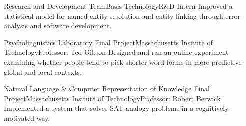 \documentclass[11pt,letter]{moderncv}
\begin{document}
\raggedright
{}%
{Research and Development Team}{Basis Technology}{R\&D Intern}{}{
%
Improved a statistical model for named-entity resolution and entity linking through error analysis and software development.
%
}
\vspace*{0.2em}

\raggedright
{}%
{Psycholinguistics Laboratory Final Project}{Massachusetts Insitute of Technology}{}{Professor: Ted Gibson}{
%
Designed and ran an online experiment examining whether people tend to pick shorter word forms in more predictive global and local contexts.
%
}
\vspace*{0.2em}

\raggedright
{}%
{Natural Language \& Computer Representation of Knowledge Final Project}{Massachusetts Insitute of Technology}{}{Professor: Robert Berwick}{
%
Implemented a system that solves SAT analogy problems in a cognitively-motivated way.
%
}
%


%
%


\vspace*{0.25em}
\end{document}
